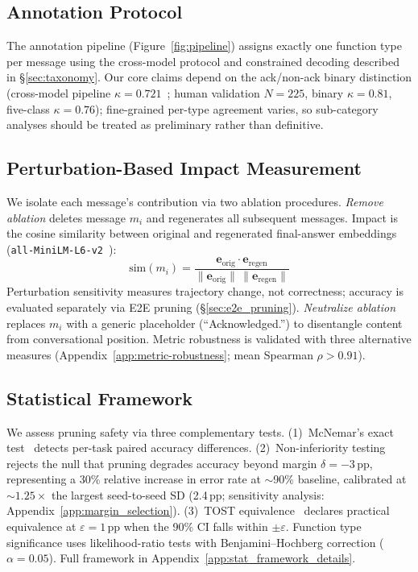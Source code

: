\subsection{Annotation Protocol}
\label{sec:methodology}
\label{sec:taxonomy_method}

The annotation pipeline (Figure~\ref{fig:pipeline}) assigns exactly one function type per message using the cross-model protocol and constrained decoding described in \S\ref{sec:taxonomy}. Our core claims depend on the ack/non-ack binary distinction (cross-model pipeline $\kappa{=}0.721$~\citep{cohen_1960}; human validation $N = 225$, binary $\kappa = 0.81$, five-class $\kappa = 0.76$); fine-grained per-type agreement varies, so sub-category analyses should be treated as preliminary rather than definitive.

\subsection{Perturbation-Based Impact Measurement}
\label{sec:perturbation}

We isolate each message's contribution via two ablation procedures. \emph{Remove ablation} deletes message $m_i$ and regenerates all subsequent messages. Impact is the cosine similarity between original and regenerated final-answer embeddings (\texttt{all-MiniLM-L6-v2}~\citep{reimers_sentence_bert_2019}):
\begin{equation}
\text{sim}(m_i) = \frac{\mathbf{e}_{\text{orig}} \cdot \mathbf{e}_{\text{regen}}}{\|\mathbf{e}_{\text{orig}}\| \, \|\mathbf{e}_{\text{regen}}\|}
\label{eq:cosine_sim}
\end{equation}
Perturbation sensitivity measures trajectory change, not correctness; accuracy is evaluated separately via E2E pruning (\S\ref{sec:e2e_pruning}). \emph{Neutralize ablation} replaces $m_i$ with a generic placeholder (``Acknowledged.'') to disentangle content from conversational position. Metric robustness is validated with three alternative measures (Appendix~\ref{app:metric-robustness}; mean Spearman $\rho > 0.91$).

\subsection{Statistical Framework}
\label{sec:statistical_framework}

We assess pruning safety via three complementary tests. (1)~McNemar's exact test~\citep{mcnemar_1947} detects per-task paired accuracy differences. (2)~Non-inferiority testing rejects the null that pruning degrades accuracy beyond margin $\delta = -3$\,pp, representing a 30\% relative increase in error rate at ${\sim}$90\% baseline, calibrated at ${\sim}1.25\times$ the largest seed-to-seed SD (2.4\,pp; sensitivity analysis: Appendix~\ref{app:margin_selection}). (3)~TOST equivalence~\citep{schuirmann_tost_1987} declares practical equivalence at $\varepsilon = 1$\,pp when the 90\% CI falls within $\pm\varepsilon$. Function type significance uses likelihood-ratio tests with Benjamini--Hochberg correction ($\alpha = 0.05$). Full framework in Appendix~\ref{app:stat_framework_details}.

